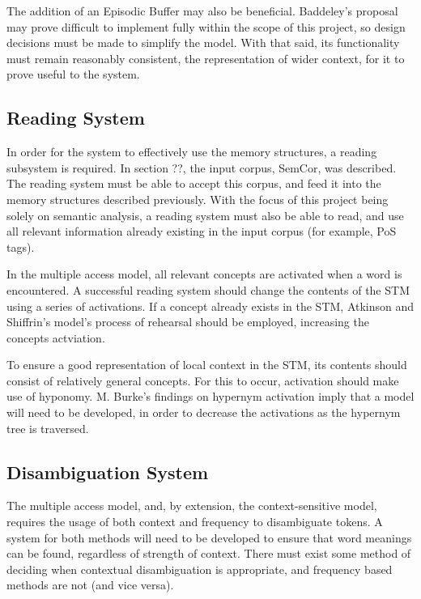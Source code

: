 \documentclass[]{article}
\begin{document}
The addition of an Episodic Buffer may also be beneficial. Baddeley’s proposal may prove difficult to implement fully within the scope of this project, so design decisions must be made to simplify the model. With that said, its functionality must remain reasonably consistent, the representation of wider context, for it to prove useful to the system.

\subsection{Reading System}
\label{sec:PARead}

In order for the system to effectively use the memory structures, a reading subsystem is required. In section ??, the input corpus, SemCor, was described. The reading system must be able to accept  this corpus, and feed it into the memory structures described previously. With the focus of this project being solely on semantic analysis, a reading system must also be able to read, and use all relevant information already existing in the input corpus (for example, PoS tags).

In the multiple access model, all relevant concepts are activated when a word is encountered.  A successful reading system should change the contents of the STM using a series of activations. If a concept already exists in the STM, Atkinson and Shiffrin’s model’s process of rehearsal should be employed, increasing the concepts actviation.  

To ensure a good representation of local context in the STM, its contents should consist of relatively general concepts.  For this to occur, activation should make use of hyponomy. M. Burke’s findings on hypernym activation imply that a model will need to be developed, in order to decrease the activations as the hypernym tree is traversed.

\subsection{Disambiguation System}
\label{sec:PADisambiguate}

The multiple access model, and, by extension, the context-sensitive model, requires the usage of both context and frequency to disambiguate tokens.  A system for both methods will need to be developed to ensure that word meanings can be found, regardless of strength of context. There must exist some method of deciding when contextual disambiguation is appropriate, and frequency based methods are not (and vice versa).
\end{document}
